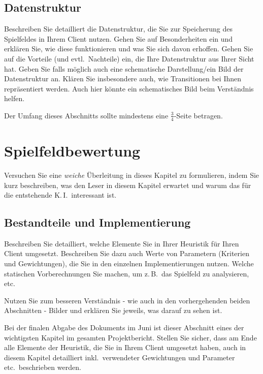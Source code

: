 \documentclass[12pt,a4paper,bibliography=totocnumbered,listof=totocnumbered]{article}
\begin{document}
\subsection{Datenstruktur}
Beschreiben Sie detailliert die Datenstruktur, die Sie zur Speicherung des Spielfeldes in Ihrem Client nutzen. Gehen Sie auf Besonderheiten ein und erklären Sie, wie diese funktionieren und was Sie sich davon erhoffen. Gehen Sie auf die Vorteile (und evtl.\ Nachteile) ein, die Ihre Datenstruktur aus Ihrer Sicht hat. Geben Sie falls möglich auch eine schematische Darstellung/ein Bild der Datenstruktur an. Klären Sie insbesondere auch, wie Transitionen bei Ihnen repräsentiert werden. Auch hier könnte ein schematisches Bild beim Verständnis helfen.

Der Umfang dieses Abschnitts sollte mindestens eine $\frac{3}{4}$-Seite betragen.


\newpage
\section{Spielfeldbewertung}
Versuchen Sie eine \emph{weiche} Überleitung in dieses Kapitel zu formulieren, indem Sie kurz beschreiben, was den Leser in diesem Kapitel erwartet und warum das für die entstehende K.\,I.\ interessant ist.

\subsection{Bestandteile und Implementierung}\label{kap:Heuristik}
Beschreiben Sie detailliert, welche Elemente Sie in Ihrer Heuristik für Ihren Client umgesetzt. Beschreiben Sie dazu auch Werte von Parametern (Kriterien und Gewichtungen), die Sie in den einzelnen Implementierungen nutzen. Welche statischen Vorberechnungen Sie machen, um z.\,B.\ das Spielfeld zu analysieren, etc.

Nutzen Sie zum besseren Verständnis - wie auch in den vorhergehenden beiden Abschnitten - Bilder und erklären Sie jeweils, was darauf zu sehen ist.

Bei der finalen Abgabe des Dokuments im Juni ist dieser Abschnitt eines der wichtigsten Kapitel im gesamten Projektbericht. Stellen Sie sicher, dass am Ende alle Elemente der Heuristik, die Sie in Ihrem Client umgesetzt haben, auch in diesem Kapitel detailliert inkl.\ verwendeter Gewichtungen und Parameter etc.\ beschrieben werden.
\end{document}
